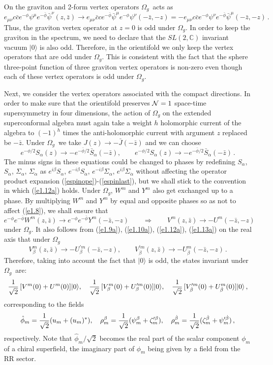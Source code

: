 \documentclass[12pt,a4paper]{article}
\newcommand{\be}{\begin{equation}}
\newcommand{\ee}{\end{equation}}
\newcommand{\refb}[1]{(\ref{#1})}
\newcommand{\IC}{\mathds{C}}
\newcommand{\NN}{{\cal N}}
\def\bz{\bar z}
\newcommand{\dalpha}{\beta}
\def\dalpha{{\dot\alpha}}
\def\dbeta{{\dot\beta}}
\def\xxi{\rho}
\def\cpi{u}
\def\cfi{\zeta}
\newcommand{\oo}{{$\Omega_g$}}
\begin{document}
On the graviton and 2-form vertex operators \oo\ acts as
\be
e_{\mu\nu} c\bar c e^{-\phi}\psi^\mu e^{-\bar\phi}\bar\psi^\nu(z,\bz) \to
e_{\mu\nu} \bar c c e^{-\bar\phi}\bar\psi^\mu e^{-\phi}\psi^\nu(-\bz,- z) =-
e_{\mu\nu} c\bar c e^{-\phi}\psi^\nu e^{-\bar\phi}\bar\psi^\mu(-\bz,- z)\, .
\ee
Thus, the graviton vertex operator at $z=0$
is odd under \oo. In order to keep the graviton in the spectrum, we
need to declare that the $SL(2,\IC)$ invariant vacuum $|0\rangle$ is also odd.
Therefore, in the orientifold we only keep the vertex operators
that are odd under \oo. This is consistent with the fact that the
sphere three-point function of three graviton
vertex operators is non-zero even though
each of these vertex operators is odd under \oo.

Next, we consider the vertex operators associated with the compact directions. In order
to make sure that the orientifold preserves $\NN=1$ space-time supersymmetry in four
dimensions, the action of $\Omega_g$ on the extended superconformal algebra must again take
a weight $h$ holomorphic current of the algebra to $(-1)^h$ times
the anti-holomorphic current with argument
$z$ replaced be $-\bz$. Under
\oo\, we take $J(z)\rightarrow -\bar J(-\bar z)$ and we can choose
\be \label{e1.12a}
e^{-\phi/2}S_\alpha(z)\to -e^{-\bar\phi/2}\bar S_\alpha(-\bz), \qquad
e^{-\phi/2}S_\dalpha(z)\to -e^{-\bar\phi/2}\bar S_\dalpha(-\bz)\, .
\ee
The minus signs in these equations could be changed to phases by redefining
$S_\alpha$, $S_\dalpha$, $\Sigma_\alpha$, $\Sigma_\dalpha$
as $e^{i\beta}S_\alpha$, $e^{-i\beta}S_\dalpha$, $e^{-i\beta}\Sigma_\alpha$,
$e^{i\beta}\Sigma_\dalpha$
without affecting the
operator product expansion \refb{espinope}-\refb{espinlast},
but we shall stick to the convention in which
\refb{e1.12a} holds.
Under \oo,
$W^{m}$ and
$Y^{m}$ also get exchanged up to a phase. By multiplying $W^m$ and $Y^m$ by equal and opposite
phases so as not to affect \refb{e1.8}, we shall ensure that
\be \label{e1.13a}
e^{-\phi}e^{-\bar\phi}W^{m}(z,\bz)\rightarrow e^{-\phi}e^{-\bar\phi}Y^{m}(-\bz,- z)
\qquad \Rightarrow \qquad
V^{m}(z,\bz)\rightarrow -U^{m}(-\bz,- z)
\ee
under \oo.
It also follows from \refb{e1.9a}, \refb{e1.10a}, \refb{e1.12a}, \refb{e1.13a} on the real
axis that under \oo\
\be
V^{m}_\beta(z,\bar z)  \rightarrow  -U^{\prime m}_{\beta}(-\bar z,- z), \qquad
 V^{\prime m}_{\dbeta}(z,\bar z)  \rightarrow  -U^{m}_{\dbeta}(-\bar z,- z)\, .
\ee
Therefore, taking into account the fact that $|0\rangle$ is odd,
the states invariant under \oo\ are:
\be\label{evertexor}
{1\over \sqrt 2} \, [V^{m}(0)+U^{m}(0)]|0\rangle, \quad
{1\over \sqrt 2} \, [V^{m}_\beta(0) + U^{\prime m}_{\beta}(0)]|0\rangle, \quad
{1\over \sqrt 2} \, [V^{\prime m}_{\dbeta}(0) + U^{m}_{\dbeta}(0)]|0\rangle\, ,
\ee
corresponding to the fields
\be \label{einvfield}
\hat\phi_m={1 \over \sqrt 2}(\cpi_m+(\cpi_m)^*), \quad \xxi_m^\beta={1 \over \sqrt 2}(\psi_m^\beta+
\cfi^{\prime \beta}_m), \quad \xxi_m^\dbeta= {1 \over \sqrt 2}(\cfi_m^\dbeta +
\psi^{\prime \dbeta}_m)\, ,
\ee
respectively. Note that $\hat\phi_m/\sqrt 2$
becomes the real part of the scalar component  $\phi_m$ of
a chiral superfield, the imaginary part of $\phi_m$
being given by a field from the RR sector.
\end{document}
